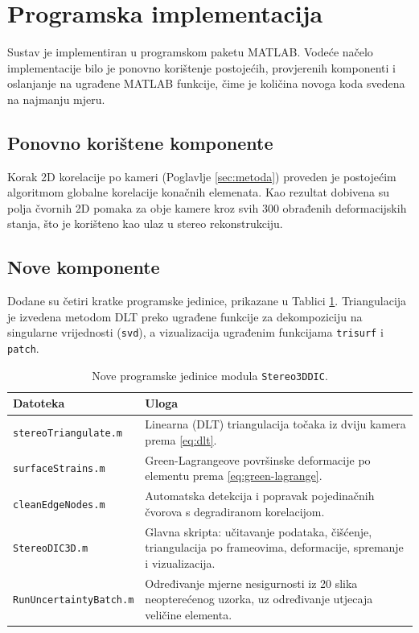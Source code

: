 \section{Programska implementacija}
\label{sec:implementacija}

Sustav je implementiran u programskom paketu MATLAB. Vodeće načelo implementacije
bilo je ponovno korištenje postojećih, provjerenih komponenti i oslanjanje na
ugrađene MATLAB funkcije, čime je količina novoga koda svedena na najmanju mjeru.

\subsection{Ponovno korištene komponente}

Korak 2D korelacije po kameri (Poglavlje \ref{sec:metoda}) proveden je postojećim
algoritmom globalne korelacije konačnih elemenata. Kao rezultat dobivena su
polja čvornih 2D pomaka za obje kamere kroz svih 300 obrađenih deformacijskih
stanja, što je korišteno
kao ulaz u stereo rekonstrukciju.

\subsection{Nove komponente}

Dodane su četiri kratke programske jedinice, prikazane u Tablici \ref{tab:moduli}.
Triangulacija je izvedena metodom DLT preko ugrađene funkcije za dekompoziciju na
singularne vrijednosti (\texttt{svd}), a vizualizacija ugrađenim funkcijama
\texttt{trisurf} i \texttt{patch}.

\begin{table}[H]
  \centering
  \caption{Nove programske jedinice modula \texttt{Stereo3DDIC}.}
  \label{tab:moduli}
  \begin{tabularx}{\textwidth}{lX}
    \toprule
    \textbf{Datoteka} & \textbf{Uloga} \\
    \midrule
    \texttt{stereoTriangulate.m} & Linearna (DLT) triangulacija točaka iz dviju
      kamera prema \eqref{eq:dlt}. \\
    \texttt{surfaceStrains.m} & Green-Lagrangeove površinske deformacije po elementu
      prema \eqref{eq:green-lagrange}. \\
    \texttt{cleanEdgeNodes.m} & Automatska detekcija i popravak pojedinačnih čvorova
      s degradiranom korelacijom. \\
    \texttt{StereoDIC3D.m} & Glavna skripta: učitavanje podataka, čišćenje,
      triangulacija po frameovima, deformacije, spremanje i vizualizacija. \\
    \texttt{RunUncertaintyBatch.m} & Određivanje mjerne
      nesigurnosti iz 20 slika neopterećenog uzorka, uz određivanje utjecaja
      veličine elementa. \\
    \bottomrule
  \end{tabularx}
\end{table}

